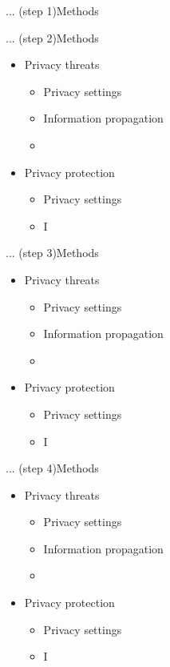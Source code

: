 \begin{frame}{... (step 1)}{Methods}
\end{frame}

\begin{frame}{... (step 2)}{Methods}
	\begin{itemize}
		\item Privacy threats
			\begin{itemize}
				\item Privacy settings
				\item Information propagation
				\item 
			\end{itemize}
		\item Privacy protection
			\begin{itemize}
				\item Privacy settings
				\item I
			\end{itemize}
	\end{itemize}
\end{frame}

\begin{frame}{... (step 3)}{Methods}
	\begin{itemize}
		\item Privacy threats
			\begin{itemize}
				\item Privacy settings
				\item Information propagation
				\item 
			\end{itemize}
		\item Privacy protection
			\begin{itemize}
				\item Privacy settings
				\item I
			\end{itemize}
	\end{itemize}
\end{frame}

\begin{frame}{... (step 4)}{Methods}
	\begin{itemize}
		\item Privacy threats
			\begin{itemize}
				\item Privacy settings
				\item Information propagation
				\item 
			\end{itemize}
		\item Privacy protection
			\begin{itemize}
				\item Privacy settings
				\item I
			\end{itemize}
	\end{itemize}
\end{frame}

